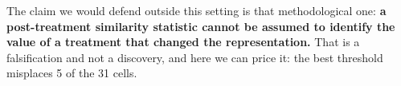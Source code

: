 The claim we would defend outside this setting is
that methodological one: \textbf{a post-treatment similarity statistic cannot be
assumed to identify the value of a treatment that changed the representation.}
That is a falsification and not a discovery, and here we can price it: the best
threshold misplaces 5 of the 31 cells.

